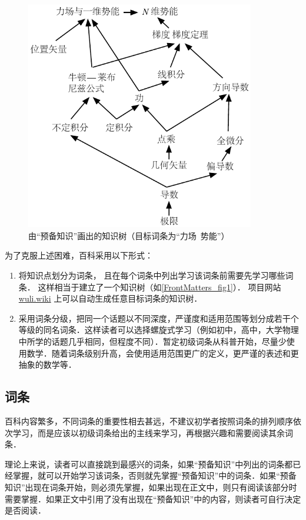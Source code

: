 \begin{figure}[ht]
\centering
\includegraphics[width=10cm]{./figures/flowchart_example.pdf}
\caption{由“预备知识”画出的知识树（目标词条为“力场\ 势能”）}\label{FrontMatters_fig1}
\end{figure}

为了克服上述困难，百科采用以下形式：
\begin{enumerate}
\item 将知识点划分为词条， 且在每个词条中列出学习该词条前需要先学习哪些词条． 这样相当于建立了一个知识树（如\autoref{FrontMatters_fig1}）． 项目网站 \href{http://wuli.wiki}{wuli.wiki} 上可以自动生成任意目标词条的知识树．
\item 采用词条分级，把同一个话题以不同深度，严谨度和适用范围等划分成若干个等级的同名词条．这样读者可以选择螺旋式学习（例如初中，高中，大学物理中所学的话题几乎相同，但程度不同）．暂定初级词条从科普开始，尽量少使用数学．随着词条级别升高，会使用适用范围更广的定义，更严谨的表述和更抽象的数学等．
\end{enumerate}

\subsection{词条}
百科内容繁多，不同词条的重要性相去甚远，不建议初学者按照词条的排列顺序依次学习，而是应该以初级词条给出的主线来学习，再根据兴趣和需要阅读其余词条．

理论上来说，读者可以直接跳到最感兴的词条，如果“预备知识”中列出的词条都已经掌握，就可以开始学习该词条，否则就先掌握“预备知识”中的词条．如果“预备知识”出现在词条开始，则必须先掌握，如果出现在正文中，则只有阅读该部分时需要掌握．如果正文中引用了没有出现在“预备知识”中的内容，则读者可自行决定是否阅读．

